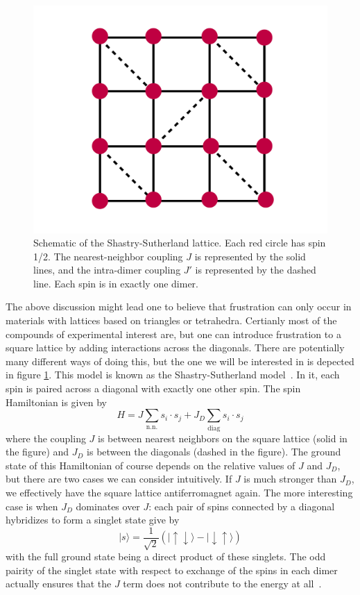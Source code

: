 \documentclass{thesis-umich}
\begin{document}
\begin{figure}
	\caption[The Shastry-Sutherland lattice]{Schematic of the Shastry-Sutherland lattice. Each red circle has spin 1/2. The nearest-neighbor coupling $J$ is represented by the solid lines, and the intra-dimer coupling $J'$ is represented by the dashed line. Each spin is in exactly one dimer.}
	\label{fig:shastry-sutherland}
	\includegraphics[width=\columnwidth]{figures/ss-model.pdf}
\end{figure}

The above discussion might lead one to believe that frustration can only occur in materials with lattices based on triangles or tetrahedra. Certianly most of the compounds of experimental interest are, but one can introduce frustration to a square lattice by adding interactions across the diagonals. There are potentially many different ways of doing this, but the one we will be interested in is depected in figure \ref{fig:shastry-sutherland}. This model is known as the Shastry-Sutherland model~\cite{Kageyama2005}. In it, each spin is paired across a diagonal with exactly one other spin. The spin Hamiltonian is given by
\[H = J \sum_{\mathrm{n.n.}}s_i \cdot s_j + J_D\sum_{\mathrm{diag}}s_i \cdot s_j\]
where the coupling $J$ is between nearest neighbors on the square lattice (solid in the figure) and $J_D$ is between the diagonals (dashed in the figure). The ground state of this Hamiltonian of course depends on the relative values of $J$ and $J_D$, but there are two cases we can consider intuitively. If $J$ is much stronger than $J_D$, we effectively have the square lattice antiferromagnet again. The more interesting case is when $J_D$ dominates over $J$: each pair of spins connected by a diagonal hybridizes to form a singlet state give by
\[ | s \rangle = \frac{1}{\sqrt{2}}(|\uparrow \downarrow \rangle - | \downarrow \uparrow \rangle) \]
with the full ground state being a direct product of these singlets. The odd pairity of the singlet state with respect to exchange of the spins in each dimer actually ensures that the $J$ term does not contribute to the energy at all~\cite{Miyahara1999}. 
\end{document}
